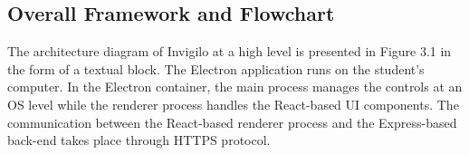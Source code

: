 \documentclass[12pt, a4paper]{report}
\begin{document}
\subsection{Overall Framework and Flowchart}

\begin{justify}
  {\fontsize{12}{18}\selectfont
    The architecture diagram of Invigilo at a high level is presented in Figure 3.1 in the form of a textual block. The Electron application runs on the student’s computer. In the Electron container, the main process manages the controls at an OS level while the renderer process handles the React-based UI components. The communication between the React-based renderer process and the Express-based back-end takes place through HTTPS protocol.
  }
\end{justify}
\end{document}
